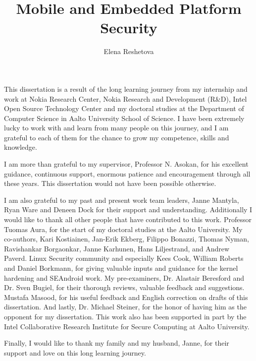\documentclass[dissertation,math,vertlayout]{aaltoseries}
\author{Elena Reshetova}
\title{Mobile and Embedded Platform Security}
\begin{document}

\draftabstract{\lipsum[1-3]}
%

\begin{preface}[Sipoo]

This dissertation is a result of the long learning journey from my internship and work at Nokia Research Center, Nokia Research and Development (R\&D), Intel Open Source Technology Center and my doctoral studies at the Department of Computer Science in Aalto University School of Science. I have been extremely lucky to work with and learn from many people on this journey, and I am grateful to each of them for the chance to grow my competence, skills and knowledge. 

I am more than grateful to my supervisor, Professor N. Asokan, for his excellent guidance, continuous support, enormous patience and encouragement through all these years. This dissertation would not have been possible otherwise. 

I am also grateful to my past and present work team leaders, Janne Mantyla, Ryan Ware and Deneen Dock for their support and understanding. Additionally I would like to thank all other people that have contributed to this work. Professor Tuomas Aura, for the start of my doctoral studies at the Aalto University. My co-authors, Kari Kostiainen, Jan-Erik Ekberg, Filippo Bonazzi, Thomas Nyman, Ravishankar Borgaonkar, Janne Karhunen, Hans Liljestrand, and Andrew Paverd. Linux Security community and especially Kees Cook, William Roberts and Daniel Borkmann, for giving valuable inputs and guidance for the kernel hardening and SEAndroid work. My pre-examiners, Dr. Alastair Beresford and Dr. Sven Bugiel, for their thorough reviews, valuable feedback and suggestions. Mustafa Masood, for his useful feedback and English correction on drafts of this dissertation. And lastly, Dr. Michael Steiner, for the honor of having him as the opponent for my dissertation. This work also has been supported in part by the Intel Collaborative Research Institute for Secure Computing at Aalto University.

Finally, I would like to thank my family and my husband, Janne, for their support and love on this long learning journey. 
\end{preface}
\end{document}
